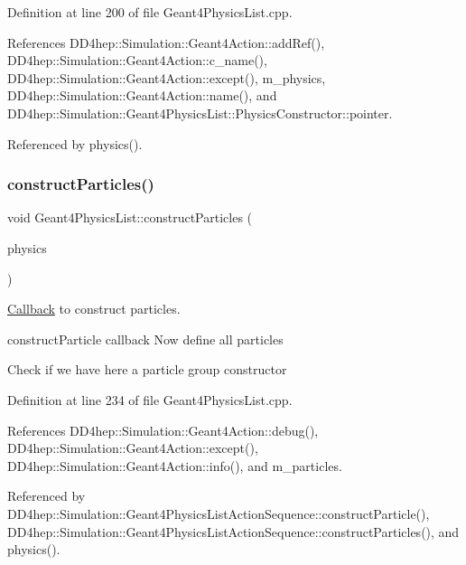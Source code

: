 Definition at line 200 of file Geant4\+Physics\+List.\+cpp.



References D\+D4hep\+::\+Simulation\+::\+Geant4\+Action\+::add\+Ref(), D\+D4hep\+::\+Simulation\+::\+Geant4\+Action\+::c\+\_\+name(), D\+D4hep\+::\+Simulation\+::\+Geant4\+Action\+::except(), m\+\_\+physics, D\+D4hep\+::\+Simulation\+::\+Geant4\+Action\+::name(), and D\+D4hep\+::\+Simulation\+::\+Geant4\+Physics\+List\+::\+Physics\+Constructor\+::pointer.



Referenced by physics().

\hypertarget{class_d_d4hep_1_1_simulation_1_1_geant4_physics_list_ab9ccc4c7870b757576312feb8674236a}{}\label{class_d_d4hep_1_1_simulation_1_1_geant4_physics_list_ab9ccc4c7870b757576312feb8674236a} 
\subsubsection{\texorpdfstring{construct\+Particles()}{constructParticles()}}
{\footnotesize\ttfamily void Geant4\+Physics\+List\+::construct\+Particles (\begin{DoxyParamCaption}\item[{G4\+V\+User\+Physics\+List $\ast$}]{physics }\end{DoxyParamCaption})\hspace{0.3cm}{\ttfamily [virtual]}}



\hyperlink{class_d_d4hep_1_1_callback}{Callback} to construct particles. 

construct\+Particle callback Now define all particles

Check if we have here a particle group constructor 

Definition at line 234 of file Geant4\+Physics\+List.\+cpp.



References D\+D4hep\+::\+Simulation\+::\+Geant4\+Action\+::debug(), D\+D4hep\+::\+Simulation\+::\+Geant4\+Action\+::except(), D\+D4hep\+::\+Simulation\+::\+Geant4\+Action\+::info(), and m\+\_\+particles.



Referenced by D\+D4hep\+::\+Simulation\+::\+Geant4\+Physics\+List\+Action\+Sequence\+::construct\+Particle(), D\+D4hep\+::\+Simulation\+::\+Geant4\+Physics\+List\+Action\+Sequence\+::construct\+Particles(), and physics().

